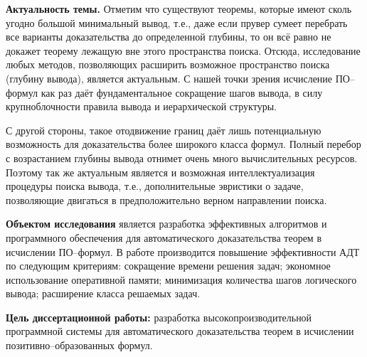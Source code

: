 \documentclass[a4paper]{report}
\begin{document}
\textbf{Актуальность темы.}
Отметим что существуют теоремы, которые имеют сколь угодно большой минимальный вывод, т.е., даже если прувер сумеет перебрать все варианты доказательства до определенной глубины, то он всё равно не докажет теорему лежащую вне этого пространства поиска. Отсюда, исследование любых методов, позволяющих расширить возможное пространство поиска (глубину вывода), является актуальным. С нашей точки зрения исчисление ПО--формул как раз даёт фундаментальное сокращение шагов вывода, в силу крупноблочности правила вывода и иерархической структуры.

С другой стороны, такое отодвижение границ даёт лишь потенциальную возможность для доказательства более широкого класса формул. Полный перебор с возрастанием глубины вывода отнимет очень много вычислительных ресурсов. Поэтому так же актуальным является и возможная интеллектуализация процедуры поиска вывода, т.е., дополнительные эвристики о задаче, позволяющие двигаться в предположительно верном направлении поиска.

\textbf{Объектом исследования} является разработка эффективных алгоритмов и программного обеспечения для автоматического доказательства теорем в исчислении ПО--формул. В работе производится повышение эффективности АДТ по следующим критериям: сокращение времени решения задач; экономное использование оперативной памяти; минимизация количества шагов логического вывода; расширение класса решаемых задач.

\textbf{Цель диссертационной работы:} разработка высокопроизводительной программной системы для автоматического доказательства теорем в исчислении позитивно--образованных формул.
\end{document}
